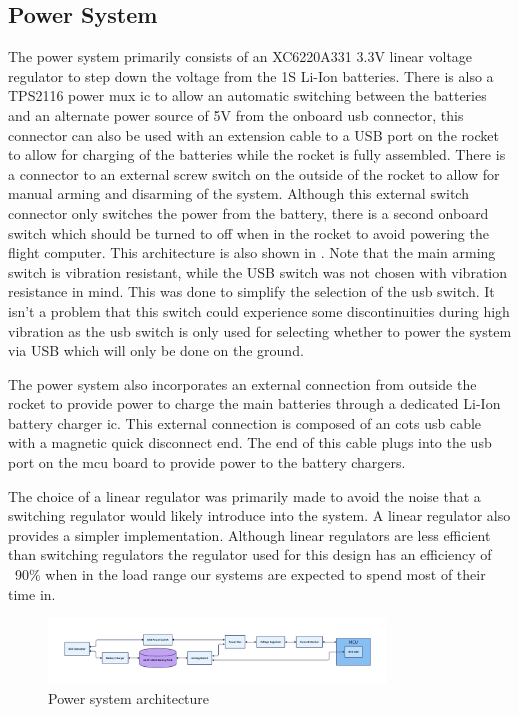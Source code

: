 \subsection{Power System}
The power system primarily consists of an XC6220A331 3.3V linear voltage regulator to step down the voltage from the 1S Li-Ion batteries. There is also a TPS2116 power mux \gls{ic} to allow an automatic switching between the batteries and an alternate power source of 5V from the onboard \gls{usb} connector, this connector can also be used with an extension cable to a USB port on the rocket to allow for charging of the batteries while the rocket is fully assembled. There is a connector to an external screw switch on the outside of the rocket to allow for manual arming and disarming of the system. Although this external switch connector only switches the power from the battery, there is a second onboard switch which should be turned to off when in the rocket to avoid powering the flight computer. This architecture is also shown in . Note that the main arming switch is vibration resistant, while the USB switch was not chosen with vibration resistance in mind. This was done to simplify the selection of the \gls{usb} switch. It isn't a problem that this switch could experience some discontinuities during high vibration as the \gls{usb} switch is only used for selecting whether to power the system via USB which will only be done on the ground.

The power system also incorporates an external connection from outside the rocket to provide power to charge the main batteries through a dedicated Li-Ion battery charger \gls{ic}. This external connection is composed of an \gls{cots} \gls{usb} cable with a magnetic quick disconnect end. The end of this cable plugs into the \gls{usb} port on the \gls{mcu} board to provide power to the battery chargers.

The choice of a linear regulator was primarily made to avoid the noise that a switching regulator would likely introduce into the system. A linear regulator also provides a simpler implementation. Although linear regulators are less efficient than switching regulators the regulator used for this design has an efficiency of ~90\% when in the load range our systems are expected to spend most of their time in. 

\begin{figure}
    \centering
    \includegraphics[width=0.8\textwidth]{assets/diagrams/power_system.png}
    \caption{Power system architecture}
    \label{fig:power-system}
\end{figure}

